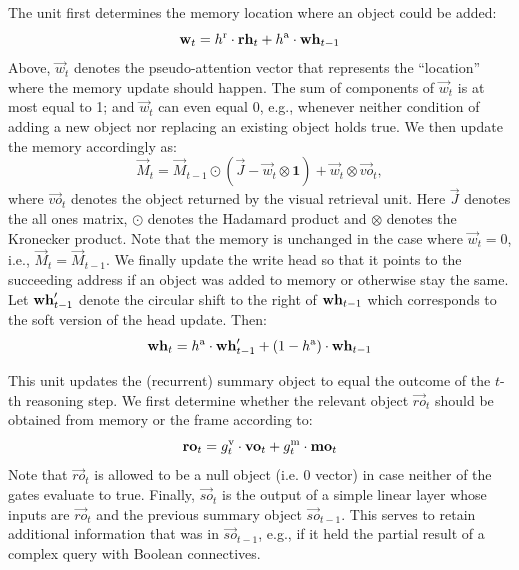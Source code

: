 The unit first determines the memory location where an object could be added:
\[ \mathbf{w}_t = h^{\mathrm{r}} \cdot \mathbf{rh}_t + h^{\mathrm{a}} \cdot \mathbf{wh}_{t-1} \]
Above, $\vec{w}_t$ denotes the pseudo-attention vector that represents the ``location'' where the memory update should happen.
The sum of components of $\vec{w}_t$ is at most equal to 1; and $\vec{w}_t$ can even equal 0, e.g., whenever neither condition of adding a new object nor replacing an existing object holds true.
We then update the memory accordingly as:
\[ \vec{M}_t = \vec{M}_{t-1} \odot (\vec{J} - \vec{w}_t  \otimes \mathbf{1}) + \vec{w}_t  \otimes \vec{vo}_t,\]
where $\vec{vo}_t$ denotes the object returned by the visual retrieval unit. 
Here $\vec{J}$ denotes the all ones matrix, $\odot$ denotes the Hadamard product and $\otimes$ denotes the Kronecker product. 
Note that the memory is unchanged in the case where $\vec{w}_t = 0$, i.e., $\vec{M}_t = \vec{M}_{t-1}$.
We finally update the write head so that it points to the succeeding address if an object was added to memory or otherwise stay the same.
Let $\mathbf{wh}'_{t-1}$ denote the circular shift to the right of $\mathbf{wh}_{t-1}$ which corresponds to the soft version of the head update.
Then:
\[ \mathbf{wh}_t = h^{\mathrm{a}} \cdot \mathbf{wh}'_{t-1} + (1-h^{\mathrm{a}}) \cdot \mathbf{wh}_{t-1} \]

This unit updates the (recurrent) summary object to equal the outcome of the $t$-th reasoning step.
We first determine whether the relevant object $\vec{ro}_t$ should be obtained from memory or the frame according to:
\[ \mathbf{ro}_t = g^{\mathrm{v}}_t \cdot \mathbf{vo}_t + g^{\mathrm{m}}_t \cdot \mathbf{mo}_t \]
Note that $\vec{ro}_t$ is allowed to be a null object (i.e. 0 vector) in case neither of the gates evaluate to true.
Finally, $\vec{so}_t$ is the output of a simple linear layer whose inputs are $\vec{ro}_t$ and the previous summary object $\vec{so}_{t-1}$.
This serves to retain additional information that was in $\vec{so}_{t-1}$, e.g., if it held the partial result of a complex query with Boolean connectives.

